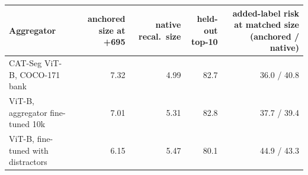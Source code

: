 \begin{tabular}{@{}lrrrr@{}}
\toprule
Aggregator & anchored size at +695 & native recal.\ size & held-out top-10 & added-label risk at matched size (anchored / native) \\
\midrule
CAT-Seg ViT-B, COCO-171 bank & 7.32 & 4.99 & 82.7 & 36.0 / 40.8 \\
ViT-B, aggregator fine-tuned 10k & 7.01 & 5.31 & 82.8 & 37.7 / 39.4 \\
ViT-B, fine-tuned with distractors & 6.15 & 5.47 & 80.1 & 44.9 / 43.3 \\
\bottomrule
\end{tabular}
